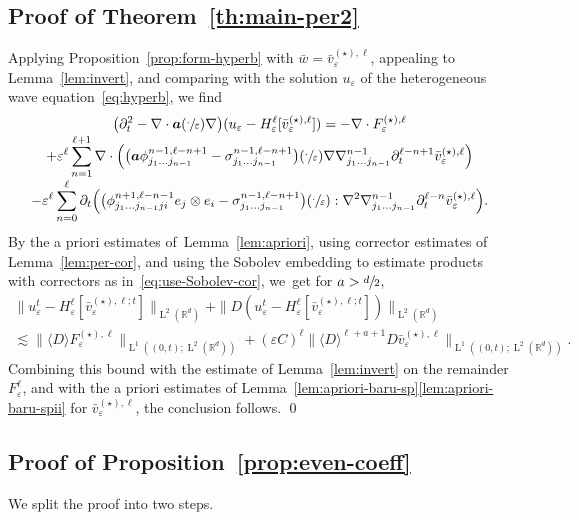 \documentclass[10pt]{amsart}
\theoremstyle{plain}
\theoremstyle{definition}
\numberwithin{equation}{section}
\newcommand{\e}{\varepsilon}
\newcommand{\R}{\mathbb R}
\newcommand{\ee}{e}
\newcommand{\Aa}{\boldsymbol a}
\newcommand{\Ld}{\operatorname{L}}
\begin{document}
\subsection{Proof of Theorem~\ref{th:main-per2}}
Applying Proposition~\ref{prop:form-hyperb} with $\bar w=\bar v^{(\star),\ell}_\e$,
appealing to Lemma~\ref{lem:invert}, and comparing with the solution $u_\e$ of the heterogeneous wave equation~\eqref{eq:hyperb}, we find\vspace*{-3pt}
\begin{multline*}
\big(\partial_t^2-\nabla\cdot\Aa(\sfrac\cdot\e)\nabla\big)(u_\e-H^\ell_\e[\bar v_\e^{(\star),\ell}])=
- \nabla \cdot F_\e^{(\star),\ell}\\[-3pt]
+\e^{\ell}\sum_{n=1}^{\ell+1}\nabla\cdot\Big(\big(\Aa\phi_{j_1\ldots j_{n-1}}^{n-1,\ell-n+1}-\sigma^{n-1,\ell-n+1}_{j_1\ldots j_{n-1}}\big)(\sfrac\cdot\e)\nabla\nabla^{n-1}_{j_1\ldots j_{n-1}}\partial_t^{\ell-n+1}\bar v_\e^{(\star),\ell}\Big)\\[-3pt]
-\e^\ell\sum_{n=0}^{\ell}\partial_t \Big(\big(\phi^{n+1,\ell-n-1}_{j_1\ldots j_{n-1}ji}\ee_{j}\otimes\ee_{i}-\sigma^{n-1,\ell-n+1}_{j_1\ldots j_{n-1}}\big)(\sfrac\cdot\e):\nabla^2\nabla^{n-1}_{j_1\ldots j_{n-1}}\partial_t^{\ell-n}\bar v_\e^{(\star),\ell} \Big).
\end{multline*}
By the a priori estimates of~Lemma~\ref{lem:apriori}, using corrector estimates of Lemma~\ref{lem:per-cor}, and using the Sobolev embedding to estimate products with correctors as in~\eqref{eq:use-Sobolev-cor}, we~get for $a>\sfrac d2$,
\begin{multline*}
\|u_\e^t-H_\e^\ell[\bar v_\e^{(\star),\ell;t}]\|_{\Ld^2(\R^d)}+\|D(u_\e^t-H_\e^\ell[\bar v_\e^{(\star),\ell;t}])\|_{\Ld^2(\R^d)}\\
\lesssim\|\langle D\rangle F_\e^{(\star),\ell}\|_{\Ld^1((0,t);\Ld^2(\R^d))}+(\e C)^\ell\|\langle D\rangle^{\ell+a+1}D\bar v_\e^{(\star),\ell}\|_{\Ld^1((0,t);\Ld^2(\R^d))}.
\end{multline*}
Combining {this bound} with the estimate of Lemma~\ref{lem:invert} on the remainder $F_\e^\ell$, and with the a priori estimates of Lemma~\ref{lem:apriori-baru-sp}\eqref{lem:apriori-baru-spii} for $\bar v_\e^{(\star),\ell}$, the conclusion follows.
\qed

\subsection{Proof of Proposition~\ref{prop:even-coeff}}\label{sec:even-coeff}
We split the proof into two steps.
\end{document}
